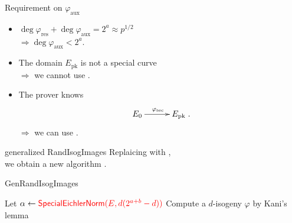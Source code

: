 \begin{frame}{Requirement on $\varphi_\mathrm{aux}$}
    \begin{itemize}
        \setlength{\itemsep}{10pt}
        \item $\deg\varphi_\mathrm{res} + \deg\varphi_\mathrm{aux} = 2^a \approx p^{1/2}$\\
            $\Rightarrow \deg\varphi_\mathrm{aux} < 2^a$.
        \item The domain $E_\mathrm{pk}$ is not a special curve\\
            $\Rightarrow$ we cannot use .
        \item The prover knows
                \begin{align*}
                    \xymatrix@C=30pt{
                        E_0 \ar[r]^{\varphi_\mathrm{sec}} & E_\mathrm{pk}
                    }.
                \end{align*}
            $\Rightarrow$ we can use .
    \end{itemize}

\end{frame}

\begin{frame}{generalized RandIsogImages}
    Replaicing  with ,\\
    we obtain a new algorithm .

    \vspace{10pt}
    \begin{algorithm}[H]
        \caption{\textsf{GenRandIsogImages}}
        \BlankLine
        Let $\alpha \leftarrow \textcolor{red}{\textsf{SpecialEichlerNorm}(E, d(2^{a+b} - d))}$\;
        Compute a $d$-isogeny $\varphi$ by Kani's lemma\;
        \Return{$\varphi$}\;
    \end{algorithm}
\end{frame}

